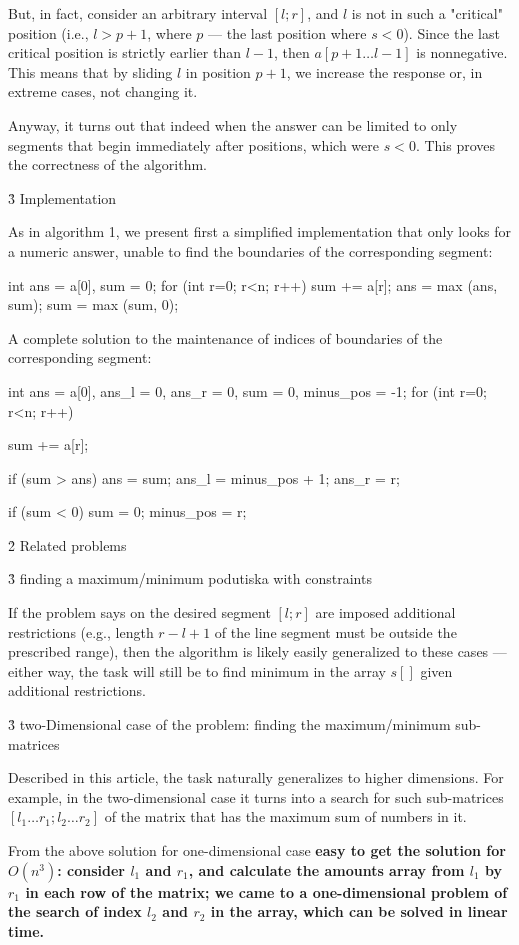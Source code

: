 But, in fact, consider an arbitrary interval $[l;r]$, and $l$ is not in such a "critical" position (i.e., $l > p+1$, where $p$ --- the last position where $s<0$). Since the last critical position is strictly earlier than $l-1$, then $a[p+1 \ldots l-1]$ is nonnegative. This means that by sliding $l$ in position $p+1$, we increase the response or, in extreme cases, not changing it.

Anyway, it turns out that indeed when the answer can be limited to only segments that begin immediately after positions, which were $s<0$. This proves the correctness of the algorithm.

\h3{ Implementation }

As in algorithm 1, we present first a simplified implementation that only looks for a numeric answer, unable to find the boundaries of the corresponding segment:

\code
int ans = a[0],
sum = 0;
for (int r=0; r<n; r++) {
sum += a[r];
ans = max (ans, sum);
sum = max (sum, 0);
}
\endcode

A complete solution to the maintenance of indices of boundaries of the corresponding segment:

\code
int ans = a[0],
ans_l = 0,
ans_r = 0,
sum = 0,
minus_pos = -1;
for (int r=0; r<n; r++) {
sum += a[r];

if (sum > ans) {
ans = sum;
ans_l = minus_pos + 1;
ans_r = r;
}

if (sum < 0) {
sum = 0;
minus_pos = r;
}
}
\endcode


\h2{ Related problems }

\h3{ finding a maximum/minimum podutiska with constraints }

If the problem says on the desired segment $[l;r]$ are imposed additional restrictions (e.g., length $r-l+1$ of the line segment must be outside the prescribed range), then the algorithm is likely easily generalized to these cases --- either way, the task will still be to find minimum in the array $s[]$ given additional restrictions.

\h3{ two-Dimensional case of the problem: finding the maximum/minimum sub-matrices }

Described in this article, the task naturally generalizes to higher dimensions. For example, in the two-dimensional case it turns into a search for such sub-matrices $[l_1 \ldots r_1; l_2 \ldots r_2]$ of the matrix that has the maximum sum of numbers in it.

From the above solution for one-dimensional case \bf{easy to get} the solution for $O(n^3)$: consider $l_1$ and $r_1$, and calculate the amounts array from $l_1$ by $r_1$ in each row of the matrix; we came to a one-dimensional problem of the search of index $l_2$ and $r_2$ in the array, which can be solved in linear time.

